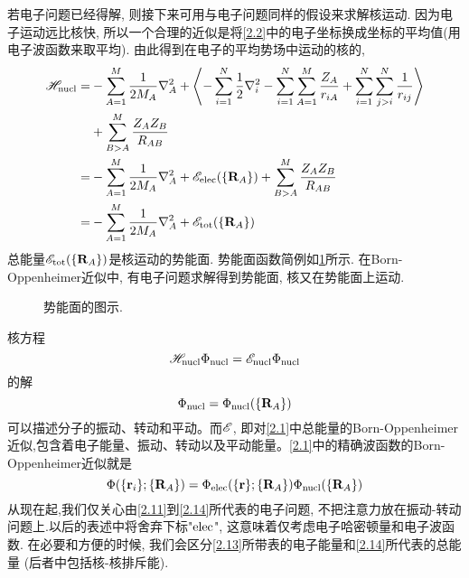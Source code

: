 若电子问题已经得解, 则接下来可用与电子问题同样的假设来求解核运动. 因为电子运动远比核快, 所以一个合理的近似是将\ref{2.2}中的电子坐标换成坐标的平均值(用电子波函数来取平均). 由此得到在电子的平均势场中运动的核的\ha,
\begin{equation}
\begin{split}
\mathscr{H}_{\rm nucl}= &- \sum_{A=1}^{M}\frac{1}{2M_A}\nabla_A^2 + \Braket{-\sum_{i=1}^{N}\frac{1}{2}\nabla_i^2 - \sum_{i=1}^{N}\sum_{A=1}^{M}\frac{Z_A}{r_{iA}} + \sum_{i=1}^{N}\sum_{j>i}^{N}\frac{1}{r_{ij}}}\\
& + \sum_{B>A}^M\frac{Z_AZ_B}{R_{AB}}\\
= & - \sum_{A=1}^{M}\frac{1}{2M_A}\nabla_A^2 + \mathscr{E}_{\rm elec}(\{\mathbf{R}_A\}) + \sum_{B>A}^M\frac{Z_AZ_B}{R_{AB}}\\
= & - \sum_{A=1}^{M}\frac{1}{2M_A}\nabla_A^2 + \mathscr{E}_{\rm tot}(\{\mathbf{R}_A\})
\end{split}
\end{equation}
总能量$ \mathscr{E}_{\rm tot}(\{\mathbf{R}_A\}) $是核运动的势能面. 势能面函数简例如\ref{f2.2}所示. 在Born-Oppenheimer近似中, 有电子问题求解得到势能面, 核又在势能面上运动. 
\begin{figure}[H]
	\def\FunctionA(#1){180*((0.6/(#1+.5))^(12) -(0.6/(#1+ .5))^(6)) + 60}
	\def\FunctionF(#1){(#1)^3- 3*(#1)}
	\caption{势能面的图示.}
	\label{f2.2}
\end{figure}
核\sch 方程
\begin{equation}
\mathscr{H}_{\rm nucl}\Phi_{\rm nucl} = \mathscr{E}_{\rm nucl}\Phi_{\rm nucl}
\end{equation}的解
\begin{equation}
\Phi_{\rm nucl}=\Phi_{\rm nucl}(\{\mathbf{R}_A\})
\end{equation}
可以描述分子的振动、转动和平动。而$\mathscr{E}$, 即对\ref{2.1}中总能量的Born-Oppenheimer近似,包含着电子能量、振动、转动以及平动能量。\ref{2.1}中的精确波函数的Born-Oppenheimer近似就是
\begin{equation}
\Phi(\{\mathbf{r}_i\};\{\mathbf{R}_A\}) = \Phi_{\rm elec}(\{\mathbf{r}\};\{\mathbf{R}_A\})\Phi_{\rm nucl}(\{\mathbf{R}_A\})
\end{equation}
从现在起,我们仅关心由\ref{2.11}到\ref{2.14}所代表的电子问题, 不把注意力放在振动-转动问题上.以后的表述中将舍弃下标"$\rm elec$",  这意味着仅考虑电子哈密顿量和电子波函数. 在必要和方便的时候, 我们会区分\ref{2.13}所带表的电子能量和\ref{2.14}所代表的总能量 (后者中包括核-核排斥能).

